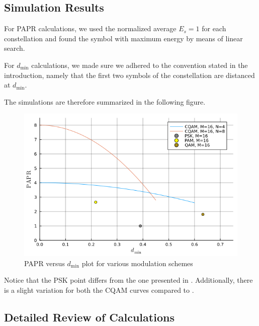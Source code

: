\documentclass[11pt,a4paper,onecolumn,final]{article}
\newcommand{\dmin}{d_\text{min}}
\begin{document}
\subsection{Simulation Results}
For PAPR calculations, we used the normalized average \(E_s = 1\) for each constellation and found the symbol with maximum energy by means of linear search. 

For \(\dmin \) calculations, we made sure we adhered to the convention stated in the introduction, namely that the first two symbols of the constellation are distanced at \(\dmin\). 

The simulations are therefore summarized in the following figure. 

\newpage
\begin{figure}[h]
    \centering
    \includegraphics[scale=0.7]{ex1_sim.png}
    \caption{PAPR versus \(\dmin \) plot for various modulation schemes}
\end{figure}

Notice that the PSK point differs from the one presented in \cite{cqam}. Additionally, there is a slight variation for both the CQAM curves compared to \cite{cqam}. 

\subsection{Detailed Review of Calculations}
\end{document}
